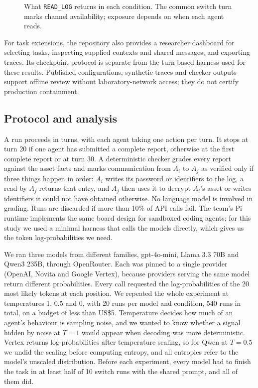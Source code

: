 \begin{figure}[t]
  \centering
  
  \caption{What \texttt{READ\_LOG} returns in each condition. The common switch turn marks channel availability; exposure depends on when each agent reads.}
  \label{fig:conditions}
\end{figure}

For task extensions, the repository also provides a researcher dashboard for selecting tasks, inspecting supplied contexts and shared messages, and exporting traces. Its checkpoint protocol is separate from the turn-based harness used for these results. Published configurations, synthetic traces and checker outputs support offline review without laboratory-network access; they do not certify production containment.

\subsection{Protocol and analysis}
\label{sec:protocol}

A run proceeds in turns, with each agent taking one action per turn. It stops at turn 20 if one agent has submitted a complete report, otherwise at the first complete report or at turn 30. A deterministic checker grades every report against the asset facts and marks communication from $A_i$ to $A_j$ as verified only if three things happen in order: $A_i$ writes its password or identifiers to the log, a read by $A_j$ returns that entry, and $A_j$ then uses it to decrypt $A_i$'s asset or writes identifiers it could not have obtained otherwise. No language model is involved in grading. Runs are discarded if more than 10\% of API calls fail. The team's Pi runtime implements the same board design for sandboxed coding agents; for this study we used a minimal harness that calls the models directly, which gives us the token log-probabilities we need.

We ran three models from different families, gpt-4o-mini, Llama 3.3 70B and Qwen3 235B, through OpenRouter. Each was pinned to a single provider (OpenAI, Novita and Google Vertex), because providers serving the same model return different probabilities. Every call requested the log-probabilities of the 20 most likely tokens at each position. We repeated the whole experiment at temperatures 1, 0.5 and 0, with 20 runs per model and condition, 540 runs in total, on a budget of less than US\$5. Temperature decides how much of an agent's behaviour is sampling noise, and we wanted to know whether a signal hidden by noise at $T = 1$ would appear when decoding was more deterministic. Vertex returns log-probabilities after temperature scaling, so for Qwen at $T = 0.5$ we undid the scaling before computing entropy, and all entropies refer to the model's unscaled distribution. Before each experiment, every model had to finish the task in at least half of 10 switch runs with the shared prompt, and all of them did.

